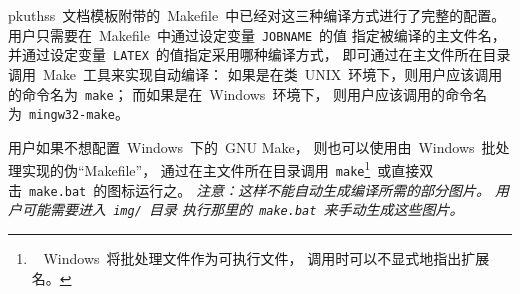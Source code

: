 	pkuthss~文档模板附带的~Makefile~中已经对这三种编译方式进行了完整的配置。
	用户只需要在~Makefile~中通过设定变量~\verb|JOBNAME|~的值%
	指定被编译的主文件名，
	并通过设定变量~\verb|LATEX|~的值指定采用哪种编译方式，
	即可通过在主文件所在目录调用~Make~工具来实现自动编译：
	如果是在类~UNIX~环境下，则用户应该调用的命令名为~\verb|make|；
	而如果是在~Windows~环境下，
	则用户应该调用的命令名为~\verb|mingw32-make|。

	用户如果不想配置~Windows~下的~GNU Make，
	则也可以使用由~Windows~批处理实现的伪“Makefile”，
	通过在主文件所在目录调用~\verb|make|\footnote%
	{\ %
		Windows~将批处理文件作为可执行文件，
		调用时可以不显式地指出扩展名。
	}~或直接双击~\verb|make.bat|~的图标运行之。%
	\emph
	{%
		注意：这样不能自动生成编译所需的部分图片。
		用户可能需要进入~\texttt{img/}~目录%
		执行那里的~\texttt{make.bat}~来手动生成这些图片。
	}

